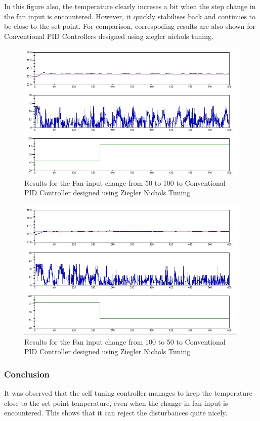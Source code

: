 In this figure also, the temperature clearly increses a bit when the step change in the fan input is encountered. However, it quickly stabilises back and continues to be close to the set point.
\newpage
For comparison, correspoding results are also shown for Conventional PID Controllers designed using ziegler nichols tuning.
\begin{figure}[h]
	\centering
\includegraphics[width=.75\linewidth]{Vikas_self/report_tex/PID_results/Conventional_Tuning/Fan_disturbance/PID/step50to100.jpg}
	\caption{Results for the Fan input change from 50 to 100 to Conventional PID Controller designed using Ziegler Nichols Tuning}
	
\end{figure}

\begin{figure}[h]
	\centering
\includegraphics[width=.75\linewidth]{Vikas_self/report_tex/PID_results/Conventional_Tuning/Fan_disturbance/PID/step100to50.jpg}
	\caption{Results for the Fan input change from 100 to 50 to Conventional PID Controller designed using Ziegler Nichols Tuning}
	
\end{figure}

\subsubsection{Conclusion}
It was observed that the self tuning controller manages to keep the temperature close to the set point temperature, even when the change in fan input is encountered. This shows that it can reject the disturbances quite nicely.

